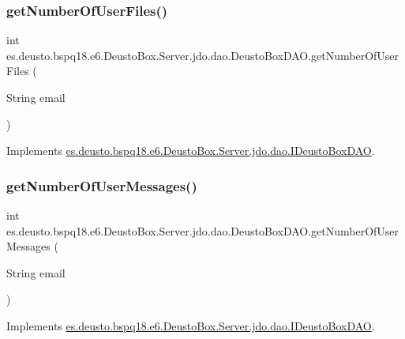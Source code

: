 \subsubsection{\texorpdfstring{get\+Number\+Of\+User\+Files()}{getNumberOfUserFiles()}}
{\footnotesize\ttfamily int es.\+deusto.\+bspq18.\+e6.\+Deusto\+Box.\+Server.\+jdo.\+dao.\+Deusto\+Box\+D\+A\+O.\+get\+Number\+Of\+User\+Files (\begin{DoxyParamCaption}\item[{String}]{email }\end{DoxyParamCaption})}



Implements \mbox{\hyperlink{interfacees_1_1deusto_1_1bspq18_1_1e6_1_1_deusto_box_1_1_server_1_1jdo_1_1dao_1_1_i_deusto_box_d_a_o_a285d230801e0a518610f1dd389d9f3f0}{es.\+deusto.\+bspq18.\+e6.\+Deusto\+Box.\+Server.\+jdo.\+dao.\+I\+Deusto\+Box\+D\+AO}}.

\mbox{\label{classes_1_1deusto_1_1bspq18_1_1e6_1_1_deusto_box_1_1_server_1_1jdo_1_1dao_1_1_deusto_box_d_a_o_a31147274fcf6c6d1f5d63d2b42c43708}} 
\subsubsection{\texorpdfstring{get\+Number\+Of\+User\+Messages()}{getNumberOfUserMessages()}}
{\footnotesize\ttfamily int es.\+deusto.\+bspq18.\+e6.\+Deusto\+Box.\+Server.\+jdo.\+dao.\+Deusto\+Box\+D\+A\+O.\+get\+Number\+Of\+User\+Messages (\begin{DoxyParamCaption}\item[{String}]{email }\end{DoxyParamCaption})}



Implements \mbox{\hyperlink{interfacees_1_1deusto_1_1bspq18_1_1e6_1_1_deusto_box_1_1_server_1_1jdo_1_1dao_1_1_i_deusto_box_d_a_o_a6aa714befe2b374ddf1c153430e8c7d3}{es.\+deusto.\+bspq18.\+e6.\+Deusto\+Box.\+Server.\+jdo.\+dao.\+I\+Deusto\+Box\+D\+AO}}.

